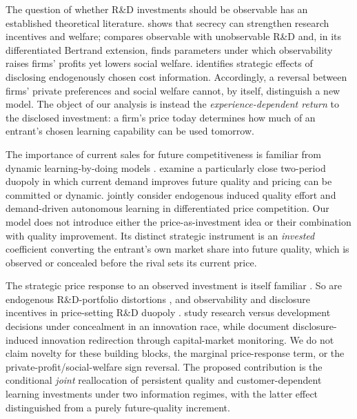 \documentclass[11pt,a4paper]{article}
\numberwithin{equation}{section}
\theoremstyle{remark}
\begin{document}
The question of whether R\&D investments should be observable has an established theoretical literature. \citet{Sengupta2016} shows that secrecy can strengthen research incentives and welfare; \citet{BaikKim2020} compares observable with unobservable R\&D and, in its differentiated Bertrand extension, finds parameters under which observability raises firms' profits yet lowers social welfare. \citet{JiangXiong2025} identifies strategic effects of disclosing endogenously chosen cost information. Accordingly, a reversal between firms' private preferences and social welfare cannot, by itself, distinguish a new model. The object of our analysis is instead the \emph{experience-dependent return} to the disclosed investment: a firm's price today determines how much of an entrant's chosen learning capability can be used tomorrow.

The importance of current sales for future competitiveness is familiar from dynamic learning-by-doing models \citep{Spence1981,CabralRiordan1994,BesankoDoraszelskiKryukov2014}. \citet{GengChenGuoXiao2022} examine a particularly close two-period duopoly in which current demand improves future quality and pricing can be committed or dynamic. \citet{KoganElOuardighi2019} jointly consider endogenous induced quality effort and demand-driven autonomous learning in differentiated price competition. Our model does not introduce either the price-as-investment idea or their combination with quality improvement. Its distinct strategic instrument is an \emph{invested} coefficient converting the entrant's own market share into future quality, which is observed or concealed before the rival sets its current price.

The strategic price response to an observed investment is itself familiar \citep{FudenbergTirole1984,BulowGeanakoplosKlemperer1985}. So are endogenous R\&D-portfolio distortions \citep{Cabral1994Portfolios,LinZhou2013}, and observability and disclosure incentives in price-setting R\&D duopoly \citep{Pae2016}. \citet{KimPoggi2026} study research versus development decisions under concealment in an innovation race, while \citet{HuangEtAl2023} document disclosure-induced innovation redirection through capital-market monitoring. We do not claim novelty for these building blocks, the marginal price-response term, or the private-profit/social-welfare sign reversal. The proposed contribution is the conditional \emph{joint} reallocation of persistent quality and customer-dependent learning investments under two information regimes, with the latter effect distinguished from a purely future-quality increment.
\end{document}
